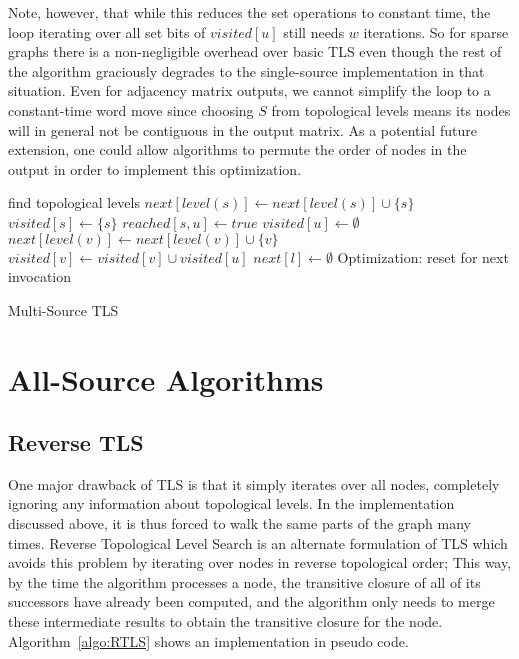 \documentclass[12pt,a4paper,twoside]{article}
\DeclareMathOperator*{\argmin}{\arg\!\min}
\begin{document}
Note, however, that while this reduces the set operations to constant time, the loop iterating over all set bits of $visited[u]$ still needs $w$ iterations. So for sparse graphs there is a non-negligible overhead over basic TLS even though the rest of the algorithm graciously degrades to the single-source implementation in that situation. Even for adjacency matrix outputs, we cannot simplify the loop to a constant-time word move since choosing $S$ from topological levels means its nodes will in general not be contiguous in the output matrix. As a potential future extension, one could allow algorithms to permute the order of nodes in the output in order to implement this optimization.

\begin{algorithm}
  \begin{algorithmic}
      \State find topological levels
        \State $next[level(s)] \gets next[level(s)] \cup \{s\}$
        \State $visited[s] \gets \{s\}$
      \EndFor
      \For{$l \gets \argmin_{s \in S} level(s), maxLevel$}
            \State $reached[s, u] \gets true$
          \EndFor
          \State $visited[u] \gets \emptyset$
              \State $next[level(v)] \gets next[level(v)] \cup \{v\}$
            \EndIf
            \State $visited[v] \gets visited[v] \cup visited[u]$
          \EndFor
        \EndFor
        \State $next[l] \gets \emptyset$ \Comment Optimization: reset for next invocation
      \EndFor
    \EndFunction
  \end{algorithmic}
  \caption{Multi-Source TLS}
  \label{algo:MultiTLS}
\end{algorithm}

\section{All-Source Algorithms}

\subsection{Reverse TLS}

One major drawback of TLS is that it simply iterates over all nodes, completely ignoring any information about topological levels. In the implementation discussed above, it is thus forced to walk the same parts of the graph many times. Reverse Topological Level Search is an alternate formulation of TLS which avoids this problem by iterating over nodes in reverse topological order; This way, by the time the algorithm processes a node, the transitive closure of all of its successors have already been computed, and the algorithm only needs to merge these intermediate results to obtain the transitive closure for the node. Algorithm~\ref{algo:RTLS} shows an implementation in pseudo code.
\end{document}
